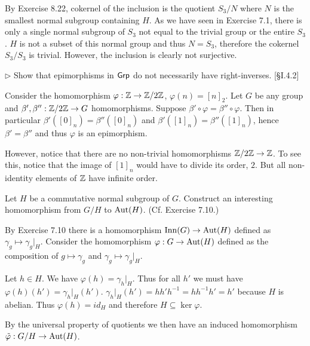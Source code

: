 \begin{solution}
	By Exercise 8.22, cokernel of the inclusion is the quotient $S_3/N$ where $N$ is the smallest normal subgroup containing $H$. As we have seen in Exercise 7.1, there is only a single normal subgroup of $S_3$ not equal to the trivial group or the entire $S_3$. $H$ is not a subset of this normal group and thus $N = S_3$, therefore the cokernel $S_3/S_3$ is trivial. However, the inclusion is clearly not surjective.
\end{solution}

\begin{problem}
	$\triangleright$ Show that epimorphisms in $\mathsf{Grp}$ do not necessarily have right-inverses. [\S I.4.2]
\end{problem}

\begin{solution}
	Consider the homomorphism $\varphi: \mathbb{Z} \to \mathbb{Z}/2\mathbb{Z}$, $\varphi(n) = [n]_2$. Let $G$ be any group and $\beta', \beta'': \mathbb{Z}/2\mathbb{Z} \to G$ homomorphisms. Suppose $\beta' \circ \varphi = \beta'' \circ \varphi$. Then in particular $\beta'([0]_n) = \beta''([0]_n)$ and $\beta'([1]_n) = \beta''([1]_n)$, hence $\beta' = \beta''$ and thus $\varphi$ is an epimorphism.
	
	However, notice that there are no non-trivial homomorphisms $\mathbb{Z}/2\mathbb{Z} \to \mathbb{Z}$. To see this, notice that the image of $[1]_n$ would have to divide its order, $2$. But all non-identity elements of $\mathbb{Z}$ have infinite order.
\end{solution}

\begin{problem}
	Let $H$ be a commutative normal subgroup of $G$. Construct an interesting homomorphism from $G/H$ to $\mathrm{Aut}(H)$. (Cf. Exercise 7.10.)
\end{problem}

\begin{solution}
	By Exercise 7.10 there is a homomorphism $\mathrm{Inn}(G) \to \mathrm{Aut}(H)$ defined as $\gamma_g \mapsto \gamma_g|_H$. Consider the homomorphism $\varphi: G \to \mathrm{Aut}(H)$ defined as the composition of $g \mapsto \gamma_g$ and $\gamma_g \mapsto \gamma_g|_H$.
	
	Let $h \in H$. We have $\varphi(h) = \gamma_h|_H$. Thus for all $h'$ we must have $\varphi(h)(h') = \gamma_h|_H(h')$. $\gamma_h|_H(h') = hh'h^{-1} = hh^{-1}h' = h'$ because $H$ is abelian. Thus $\varphi(h) = id_H$ and therefore $H \subseteq \ker \varphi$.
	
	By the universal property of quotients we then have an induced homomorphism $\tilde{\varphi}: G/H \to \mathrm{Aut}(H)$.
\end{solution}

